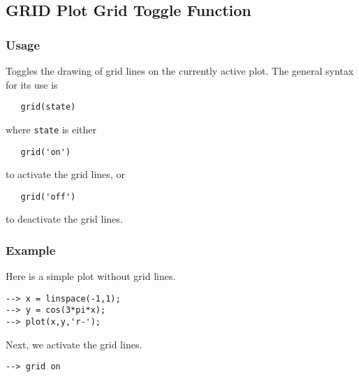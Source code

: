 %
%
%
\subsection{GRID Plot Grid Toggle Function}
\subsubsection{Usage}
Toggles the drawing of grid lines on the currently active plot.  The
general syntax for its use is
\begin{verbatim}
   grid(state)
\end{verbatim}
where \verb|state| is either
\begin{verbatim}
   grid('on')
\end{verbatim}
to activate the grid lines, or
\begin{verbatim}
   grid('off')
\end{verbatim}
to deactivate the grid lines.
\subsubsection{Example}
Here is a simple plot without grid lines.
\begin{verbatim}
--> x = linspace(-1,1);
--> y = cos(3*pi*x);
--> plot(x,y,'r-');
\end{verbatim}


Next, we activate the grid lines.
\begin{verbatim}
--> grid on
\end{verbatim}

